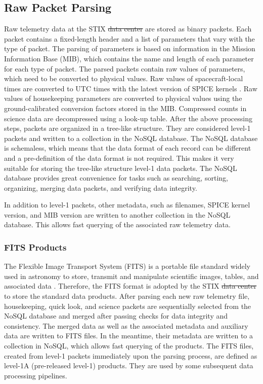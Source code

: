 \documentclass[referee]{aa} %
\providecommand{\DIFaddtex}[1]{{\protect\color{blue}\uwave{#1}}} %
\providecommand{\DIFdeltex}[1]{{\protect\color{red}\sout{#1}}}                      %
\providecommand{\DIFaddbegin}{} %
\providecommand{\DIFaddend}{} %
\providecommand{\DIFdelbegin}{} %
\providecommand{\DIFdelend}{} %
\providecommand{\DIFadd}[1]{\texorpdfstring{\DIFaddtex{#1}}{#1}} %
\providecommand{\DIFdel}[1]{\texorpdfstring{\DIFdeltex{#1}}{}} %
\newcommand{\DIFscaledelfig}{0.5}
\newlength{\DIFdelgraphicswidth} %
\newlength{\DIFdelgraphicsheight} %
\newcommand{\DIFaddincludegraphics}[2][]{{\color{blue}\fbox{\DIFOincludegraphics[#1]{#2}}}} %
\newcommand{\DIFdelincludegraphics}[2][]{%
\sbox{\DIFdelgraphicsbox}{\DIFOincludegraphics[#1]{#2}}%
\settoboxwidth{\DIFdelgraphicswidth}{\DIFdelgraphicsbox} %
\settoboxtotalheight{\DIFdelgraphicsheight}{\DIFdelgraphicsbox} %
\scalebox{\DIFscaledelfig}{%
\parbox[b]{\DIFdelgraphicswidth}{\usebox{\DIFdelgraphicsbox}\\[-\baselineskip] \rule{\DIFdelgraphicswidth}{0em}}\llap{\resizebox{\DIFdelgraphicswidth}{\DIFdelgraphicsheight}{%
\setlength{\unitlength}{\DIFdelgraphicswidth}%
\begin{picture}(1,1)%
\thicklines\linethickness{2pt} %
{\color[rgb]{1,0,0}\put(0,0){\framebox(1,1){}}}%
{\color[rgb]{1,0,0}\put(0,0){\line( 1,1){1}}}%
{\color[rgb]{1,0,0}\put(0,1){\line(1,-1){1}}}%
\end{picture}%
}\hspace*{3pt}}} %
} %
\DeclareRobustCommand{\DIFaddbegin}{\DIFOaddbegin \let\includegraphics\DIFaddincludegraphics} %
\DeclareRobustCommand{\DIFaddend}{\DIFOaddend \let\includegraphics\DIFOincludegraphics} %
\DeclareRobustCommand{\DIFdelbegin}{\DIFOdelbegin \let\includegraphics\DIFdelincludegraphics} %
\DeclareRobustCommand{\DIFdelend}{\DIFOaddend \let\includegraphics\DIFOincludegraphics} %
\begin{document}
\subsection{Raw Packet Parsing}
Raw telemetry data at the STIX \DIFdelbegin \DIFdel{data center }\DIFdelend \DIFaddbegin \DIFadd{Data Center }\DIFaddend are stored as binary packets. 
Each packet contains a fixed-length header and a list of parameters that vary with the type of packet.  The parsing of parameters is based on information in the Mission Information Base (MIB), which contains the name and length of each parameter for each type of packet. 
The parsed packets contain raw values of parameters, which need to be converted to physical values. 
Raw values of spacecraft-local times are converted to UTC times with the latest version of SPICE kernels \citep{spice1996,spice2018,spicedoi}.  Raw values of housekeeping parameters are converted to physical values using the ground-calibrated conversion factors stored in the MIB. 
Compressed counts in science data are decompressed using a look-up table. 
After the above processing steps, packets are organized in a tree-like structure. 
They are considered level-1 packets and written to a collection in the NoSQL database. 
The NoSQL database is schemaless, which means that the data format of each record can be different and a pre-definition of the data format is not required.
This makes it very suitable for storing the tree-like structure level-1 data packets.  
The NoSQL database provides great convenience  for tasks such as searching, sorting, organizing, merging data packets, and verifying data integrity.

In addition to level-1 packets, other metadata, such as filenames, SPICE kernel version, and MIB version are written to another collection in the NoSQL database.
This allows fast querying of the associated raw telemetry data.

\subsubsection{FITS Products}
The Flexible Image Transport System (FITS) is a portable file standard widely used in astronomy to store, transmit and manipulate scientific images, tables, and associated data \citep{fits}.
Therefore, the FITS format is adopted by the STIX \DIFdelbegin \DIFdel{data center }\DIFdelend \DIFaddbegin \DIFadd{Data Center }\DIFaddend to store the standard data products. 
After parsing each new raw telemetry file, housekeeping, quick look, and science packets are sequentially selected from the NoSQL database and merged after passing checks for data integrity and consistency.  The merged data as well as the associated metadata and auxiliary data are written to FITS files.  In the meantime, their metadata are written to a collection in NoSQL, which allows fast querying of the products. The FITS files, created from level-1 packets immediately upon the parsing process, are defined as level-1A (pre-released level-1) products.  They are used by some subsequent data processing pipelines.  
\end{document}
